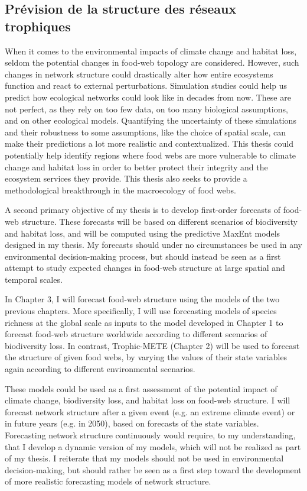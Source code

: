 \subsection{Prévision de la structure des réseaux trophiques} 

When it comes to the environmental impacts of climate change and
habitat loss, seldom the potential changes in food-web topology are considered.
However, such changes in network structure could drastically alter how entire
ecosystems function and react to external perturbations. Simulation studies
could help us predict how ecological networks could look like in decades from
now. These are not perfect, as they rely on too few data, on too many biological
assumptions, and on other ecological models. Quantifying the uncertainty of
these simulations and their robustness to some assumptions, like the choice of
spatial scale, can make their predictions a lot more realistic and
contextualized. This thesis could potentially help identify regions where food
webs are more vulnerable to climate change and habitat loss in order to better
protect their integrity and the ecosystem services they provide. This thesis
also seeks to provide a methodological breakthrough in the macroecology of food
webs.

A second primary objective of my thesis is to develop first-order forecasts of
food-web structure. These forecasts will be based on different scenarios of
biodiversity and habitat loss, and will be computed using the predictive MaxEnt
models designed in my thesis. My forecasts should under no circumstances be used
in any environmental decision-making process, but should instead be seen as a
first attempt to study expected changes in food-web structure at large spatial
and temporal scales.

In Chapter 3, I will forecast food-web structure using the models of the two
previous chapters. More specifically, I will use forecasting models of species
richness at the global scale as inputs to the model developed in Chapter 1 to
forecast food-web structure worldwide according to different scenarios of
biodiversity loss. In contrast, Trophic-METE (Chapter 2) will be used to
forecast the structure of given food webs, by varying the values of their state
variables again according to different environmental scenarios.

These models could be used as a first assessment of the potential impact of
climate change, biodiversity loss, and habitat loss on food-web structure. I
will forecast network structure after a given event (e.g. an extreme climate
event) or in future years (e.g. in 2050), based on forecasts of the state
variables. Forecasting network structure continuously would require, to my
understanding, that I develop a dynamic version of my models, which will not be
realized as part of my thesis. I reiterate that my models should not be used in
environmental decision-making, but should rather be seen as a first step toward
the development of more realistic forecasting models of network structure.

